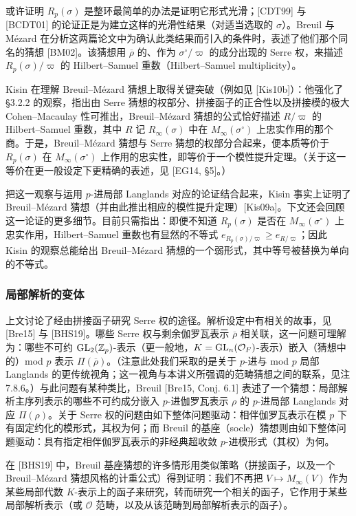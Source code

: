 或许证明 $R_p(\sigma)$ 是整环最简单的办法是证明它形式光滑；[CDT99] 与 [BCDT01] 的论证正是为建立这样的光滑性结果（对适当选取的 $\sigma$）。Breuil 与 Mézard 在分析这两篇论文中为确认此类结果而引入的条件时，表述了他们那个同名的猜想 [BM02]。该猜想用 $\overline{\rho}$ 的、作为 $\sigma^\circ/\varpi$ 的成分出现的 Serre 权，来描述 $R_p(\sigma)/\varpi$ 的 Hilbert--Samuel 重数（Hilbert--Samuel multiplicity）。

Kisin 在理解 Breuil--Mézard 猜想上取得关键突破（例如见 [Kis10b]）：他强化了 §3.2.2 的观察，指出由 Serre 猜想的权部分、拼接函子的正合性以及拼接模的极大 Cohen--Macaulay 性可推出，Breuil--Mézard 猜想的公式恰好描述 $R/\varpi$ 的 Hilbert--Samuel 重数，其中 $R$ 记 $R_\infty(\sigma)$ 中在 $M_\infty(\sigma^\circ)$ 上忠实作用的那个商。于是，Breuil--Mézard 猜想与 Serre 猜想的权部分合起来，便本质等价于 $R_p(\sigma)$ 在 $M_\infty(\sigma^\circ)$ 上作用的忠实性，即等价于一个模性提升定理。（关于这一等价在更一般设定下更精确的表述，见 [EG14, §5]。）

把这一观察与运用 $p$-进局部 Langlands 对应的论证结合起来，Kisin 事实上证明了 Breuil--Mézard 猜想（并由此推出相应的模性提升定理）[Kis09a]。下文还会回顾这一论证的更多细节。目前只需指出：即便不知道 $R_p(\sigma)$ 是否在 $M_\infty(\sigma^\circ)$ 上忠实作用，Hilbert--Samuel 重数也有显然的不等式 $e_{R_p(\sigma)/\varpi}\ge e_{R/\varpi}$；因此 Kisin 的观察总能给出 Breuil--Mézard 猜想的一个弱形式，其中等号被替换为单向的不等式。

\subsubsection{局部解析的变体}

上文讨论了经由拼接函子研究 Serre 权的途径。解析设定中有相关的故事，见 [Bre15] 与 [BHS19]。哪些 Serre 权与剩余伽罗瓦表示 $\overline{\rho}$ 相关联，这一问题可理解为：哪些不可约 $\mathrm{GL}_2(\mathbb{Z}_p)$-表示（更一般地，$K=\mathrm{GL}_n(\mathcal{O}_F)$-表示）嵌入（猜想中的）mod $p$ 表示 $\Pi(\overline{\rho})$。（注意此处我们采取的是关于 $p$-进与 mod $p$ 局部 Langlands 的更传统视角；这一视角与本讲义所强调的范畴猜想之间的联系，见注 7.8.6。）与此问题有某种类比，Breuil [Bre15, Conj. 6.1] 表述了一个猜想：局部解析主序列表示的哪些不可约成分嵌入 $p$-进伽罗瓦表示 $\rho$ 的 $p$-进局部 Langlands 对应 $\Pi(\rho)$。关于 Serre 权的问题由如下整体问题驱动：相伴伽罗瓦表示在模 $p$ 下有固定约化的模形式，其权为何；而 Breuil 的基座（socle）猜想则由如下整体问题驱动：具有指定相伴伽罗瓦表示的非经典超收敛 $p$-进模形式（其权）为何。

在 [BHS19] 中，Breuil 基座猜想的许多情形用类似策略（拼接函子，以及一个 Breuil--Mézard 猜想风格的计重公式）得到证明：我们不再把 $V\mapsto M_\infty(V)$ 作为某些局部代数 $K$-表示上的函子来研究，转而研究一个相关的函子，它作用于某些局部解析表示（或 $\mathcal{O}$ 范畴，以及从该范畴到局部解析表示的函子）。

